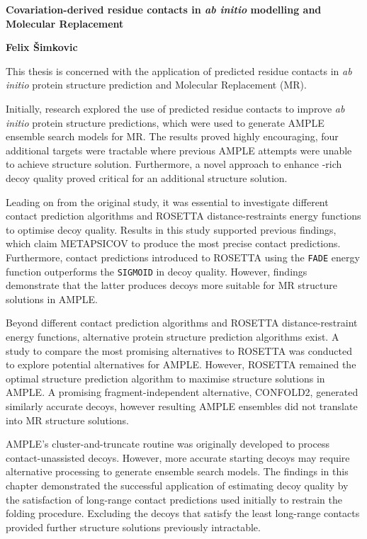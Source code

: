 \begin{center}
    \Large
    \textbf{Covariation-derived residue contacts in \textit{ab initio} modelling and Molecular Replacement}

    \vspace{0.5cm}
    \textbf{Felix \v{S}imkovic}
    \vspace{0.5cm}
\end{center}

\singlespacing
This thesis is concerned with the application of predicted residue contacts in \textit{ab initio} protein structure prediction and Molecular Replacement (MR).

Initially, research explored the use of predicted residue contacts to improve \textit{ab initio} protein structure predictions, which were used to generate AMPLE ensemble search models for MR. The results proved highly encouraging, four additional targets were tractable where previous AMPLE attempts were unable to achieve structure solution. Furthermore, a novel approach to enhance \textbeta-rich decoy quality proved critical for an additional structure solution. 

Leading on from the original study, it was essential to investigate different contact prediction algorithms and ROSETTA distance-restraints energy functions to optimise decoy quality. Results in this study supported previous findings, which claim METAPSICOV to produce the most precise contact predictions. Furthermore, contact predictions introduced to ROSETTA using the \texttt{FADE} energy function outperforms the \texttt{SIGMOID} in decoy quality. However, findings demonstrate that the latter produces decoys more suitable for MR structure solutions in AMPLE.

Beyond different contact prediction algorithms and ROSETTA distance-restraint energy functions, alternative protein structure prediction algorithms exist. A study to compare the most promising alternatives to ROSETTA was conducted to explore potential alternatives for AMPLE. However, ROSETTA remained the optimal structure prediction algorithm to maximise structure solutions in AMPLE. A promising fragment-independent alternative, CONFOLD2, generated similarly accurate decoys, however resulting AMPLE ensembles did not translate into MR structure solutions.

AMPLE's cluster-and-truncate routine was originally developed to process contact-unassisted decoys. However, more accurate starting decoys may require alternative processing to generate ensemble search models. The findings in this chapter demonstrated the successful application of estimating decoy quality by the satisfaction of long-range contact predictions used initially to restrain the folding procedure. Excluding the decoys that satisfy the least long-range contacts provided further structure solutions previously intractable.


